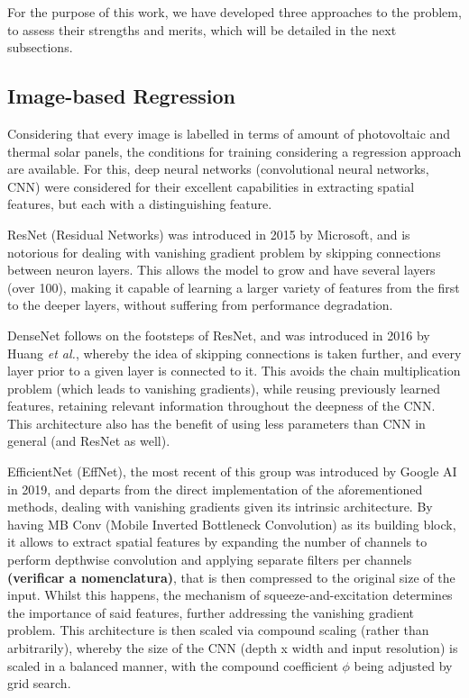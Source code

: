 \documentclass[conference]{IEEEtran}
\begin{document}
For the purpose of this work, we have developed three approaches to the problem, to assess their strengths and merits, which will be detailed in the next subsections.

\subsection{Image-based Regression}

Considering that every image is labelled in terms of amount of photovoltaic and thermal solar panels, the conditions for training considering a regression approach are available. For this, deep neural networks (convolutional neural networks, CNN) were considered for their excellent capabilities in extracting spatial features, but each with a distinguishing feature.

ResNet (Residual Networks) was introduced in 2015 by Microsoft, and is notorious for dealing with vanishing gradient problem by skipping connections between neuron layers. This allows the model to grow and have several layers (over 100), making it capable of learning a larger variety of features from the first to the deeper layers, without suffering from performance degradation.

DenseNet follows on the footsteps of ResNet, and was introduced in 2016 by Huang \textit{et al.}, whereby the idea of skipping connections is taken further, and every layer prior to a given layer is connected to it. This avoids the chain multiplication problem (which leads to vanishing gradients), while reusing previously learned features, retaining relevant information throughout the deepness of the CNN. This architecture also has the benefit of using less parameters than CNN in general (and ResNet as well).

EfficientNet (EffNet), the most recent of this group was introduced by Google AI in 2019, and departs from the direct implementation of the aforementioned methods, dealing with vanishing gradients given its intrinsic architecture. By having MB Conv (Mobile Inverted Bottleneck Convolution) as its building block, it allows to extract spatial features by expanding the number of channels to perform depthwise convolution and applying separate filters per channels \textbf{(verificar a nomenclatura)}, that is then compressed to the original size of the input. Whilst this happens, the mechanism of squeeze-and-excitation determines the importance of said features, further addressing the vanishing gradient problem. This architecture is then scaled via compound scaling (rather than arbitrarily), whereby the size of the CNN (depth x width and input resolution) is scaled in a balanced manner, with the compound coefficient $\phi$ being adjusted by grid search.
\end{document}
